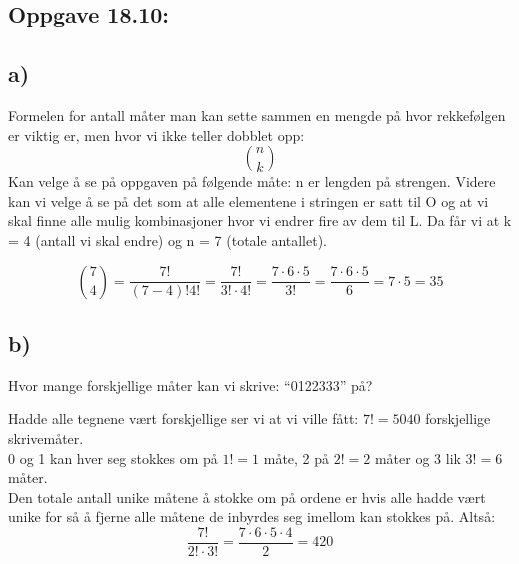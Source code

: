 \documentclass[a4paper, norsk, 10pt]{article}
\begin{document}
\begin{flushleft}
    \section*{Oppgave 18.10:}
    \subsection*{a)}
    Formelen for antall måter man kan sette sammen en mengde på hvor rekkefølgen er viktig er, men hvor vi ikke teller dobblet opp:
    \[\binom{n}{k}\]
    Kan velge å se på oppgaven på følgende måte:
    n er lengden på strengen. Videre kan vi velge å se på det som at alle elementene i stringen er satt til O og at vi skal finne alle mulig kombinasjoner hvor vi endrer fire av dem til L. Da får vi at k = 4 (antall vi skal endre) og n = 7 (totale antallet). 
    
    \[\binom{7}{4} = \frac{7!}{(7-4)!4!} = \frac{7!}{3!\cdot4!} = \frac{7\cdot6\cdot 5}{3!} = \frac{7\cdot6\cdot 5}{6} = 7\cdot 5 = 35\]


    \subsection*{b)}
    
    Hvor mange forskjellige måter kan vi skrive: ``0122333'' på?

    Hadde alle tegnene vært forskjellige ser vi at vi ville fått: \quad $7! = 5040$ forskjellige skrivemåter. \\
    0 og 1 kan hver seg stokkes om på $1! = 1$ måte, 2 på $2! = 2$ måter og 3 lik $3! = 6$ måter.
    \\
    Den totale antall unike måtene å stokke om på ordene er hvis alle hadde vært unike for så å fjerne alle måtene de inbyrdes seg imellom kan stokkes på. Altså:
    \[\frac{7!}{2!\cdot3!} = \frac{7\cdot 6 \cdot 5 \cdot 4}{2} = 420\] 
\end{flushleft}
\end{document}
